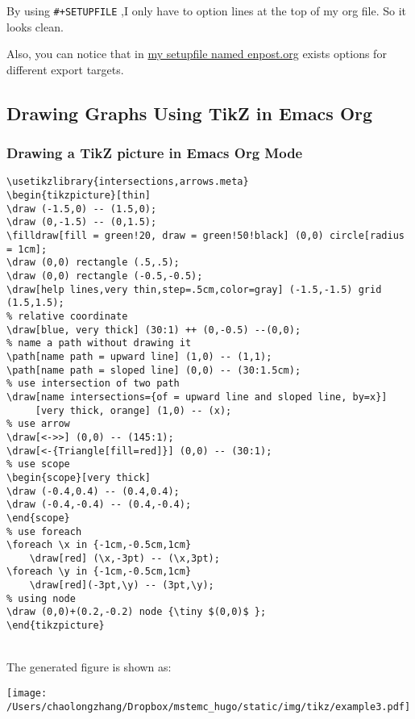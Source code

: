 \documentclass[koma,utopia,a4paper,captions=tableheading,11pt,listings-sv,microtype,paralist,colorlinks=true,urlcolor=blue]{org-article}
\begin{document}
By using \texttt{\#+SETUPFILE} ,I only have to option lines at the top of my org file.
So it looks clean.

Also, you can notice that in \href{https://github.com/msteamc/.spacemacs.d/blob/master/org-templates/enpost.org}{my setupfile named enpost.org} exists options for
different export targets.

\subsection{Drawing Graphs Using TikZ in Emacs Org}
\label{sec:org220de70}



\subsubsection{Drawing a TikZ picture in Emacs Org Mode}
\label{sec:orgd491791}


\begin{lstlisting}
\usetikzlibrary{intersections,arrows.meta}
\begin{tikzpicture}[thin]
\draw (-1.5,0) -- (1.5,0);
\draw (0,-1.5) -- (0,1.5);
\filldraw[fill = green!20, draw = green!50!black] (0,0) circle[radius = 1cm];
\draw (0,0) rectangle (.5,.5);
\draw (0,0) rectangle (-0.5,-0.5);
\draw[help lines,very thin,step=.5cm,color=gray] (-1.5,-1.5) grid (1.5,1.5);
% relative coordinate
\draw[blue, very thick] (30:1) ++ (0,-0.5) --(0,0);
% name a path without drawing it
\path[name path = upward line] (1,0) -- (1,1);
\path[name path = sloped line] (0,0) -- (30:1.5cm);
% use intersection of two path
\draw[name intersections={of = upward line and sloped line, by=x}]
     [very thick, orange] (1,0) -- (x);
% use arrow
\draw[<->>] (0,0) -- (145:1);
\draw[<-{Triangle[fill=red]}] (0,0) -- (30:1);
% use scope
\begin{scope}[very thick]
\draw (-0.4,0.4) -- (0.4,0.4);
\draw (-0.4,-0.4) -- (0.4,-0.4);
\end{scope}
% use foreach
\foreach \x in {-1cm,-0.5cm,1cm}
    \draw[red] (\x,-3pt) -- (\x,3pt);
\foreach \y in {-1cm,-0.5cm,1cm}
    \draw[red](-3pt,\y) -- (3pt,\y);
% using node
\draw (0,0)+(0.2,-0.2) node {\tiny $(0,0)$ };
\end{tikzpicture}
\end{lstlisting}


\hspace{0pt}\\
The generated figure is shown as:
\begin{center}
\texttt{[image: /Users/chaolongzhang/Dropbox/mstemc\_hugo/static/img/tikz/example3.pdf]}
\end{center}
\end{document}
